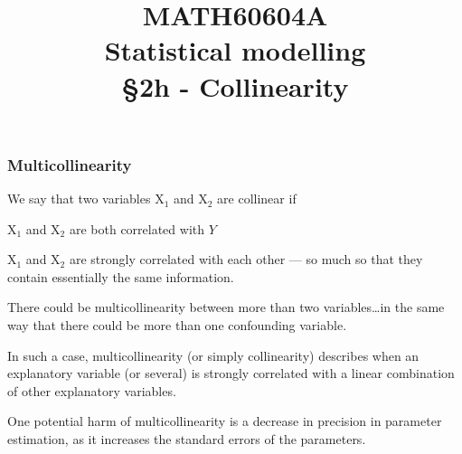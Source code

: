 \documentclass{beamer}
\title[\color{white}{MATH60604A Collinearity}]{\texorpdfstring{MATH60604A \\Statistical modelling \\ \S 2h - Collinearity}{MATH60604A \\Statistical modelling \\ \S~2h - Collinearity}}
\author{}
\institute{HEC Montréal\\
Department of Decision Sciences}
\date{}
\begin{document}
\frame{\titlepage}


\begin{frame}
\frametitle{Multicollinearity}
\bi
\item We say that two variables $\mathrm{X}_1$ and $\mathrm{X}_2$ are \alert{collinear} if
\bi
\vp
\item $\mathrm{X}_1$ and $\mathrm{X}_2$ are both correlated with $Y$
\item $\mathrm{X}_1$ and $\mathrm{X}_2$ are strongly correlated with each other --- so much so that they contain essentially the same information.
\ei
\item There could be multicollinearity between more than two variables\ldots in the same way that there could be more than one confounding variable.
\item In such a case, \alert{multicollinearity} (or simply collinearity) describes when an explanatory variable (or several) is strongly correlated with a linear combination of other explanatory variables.
\item One potential harm of multicollinearity is a \alert{decrease in precision} in parameter estimation, as it increases the standard errors of the parameters. 
\ei
\end{frame}

% 
\end{document}
